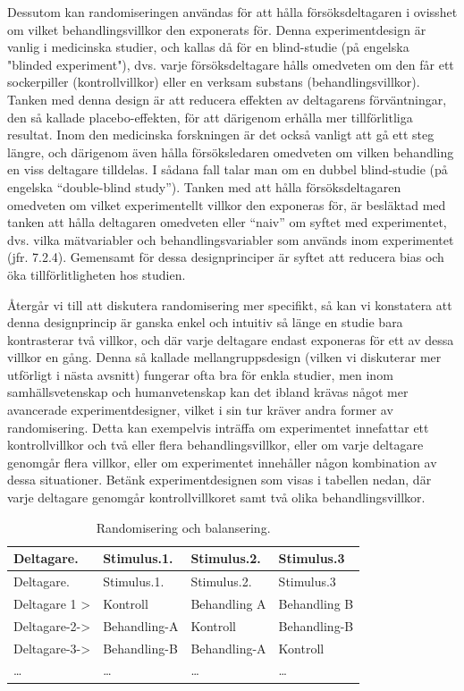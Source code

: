 \documentclass[
]{book}
\begin{document}
Dessutom kan randomiseringen användas för att hålla försöksdeltagaren i ovisshet om vilket behandlingsvillkor den exponerats för. Denna experimentdesign är vanlig i medicinska studier, och kallas då för en blind-studie (på engelska "blinded experiment"), dvs. varje försöksdeltagare hålls omedveten om den får ett sockerpiller (kontrollvillkor) eller en verksam substans (behandlingsvillkor). Tanken med denna design är att reducera effekten av deltagarens förväntningar, den så kallade placebo-effekten, för att därigenom erhålla mer tillförlitliga resultat. Inom den medicinska forskningen är det också vanligt att gå ett steg längre, och därigenom även hålla försöksledaren omedveten om vilken behandling en viss deltagare tilldelas. I sådana fall talar man om en dubbel blind-studie (på engelska ``double-blind study''). Tanken med att hålla försöksdeltagaren omedveten om vilket experimentellt villkor den exponeras för, är besläktad med tanken att hålla deltagaren omedveten eller ``naiv'' om syftet med experimentet, dvs. vilka mätvariabler och behandlingsvariabler som används inom experimentet (jfr. 7.2.4). Gemensamt för dessa designprinciper är syftet att reducera bias och öka tillförlitligheten hos studien.

Återgår vi till att diskutera randomisering mer specifikt, så kan vi konstatera att denna designprincip är ganska enkel och intuitiv så länge en studie bara kontrasterar två villkor, och där varje deltagare endast exponeras för ett av dessa villkor en gång. Denna så kallade mellangruppsdesign (vilken vi diskuterar mer utförligt i nästa avsnitt) fungerar ofta bra för enkla studier, men inom samhällsvetenskap och humanvetenskap kan det ibland krävas något mer avancerade experimentdesigner, vilket i sin tur kräver andra former av randomisering. Detta kan exempelvis inträffa om experimentet innefattar ett kontrollvillkor och två eller flera behandlingsvillkor, eller om varje deltagare genomgår flera villkor, eller om experimentet innehåller någon kombination av dessa situationer. Betänk experimentdesignen som visas i tabellen nedan, där varje deltagare genomgår kontrollvillkoret samt två olika behandlingsvillkor.

\begin{longtable}[]{@{}llll@{}}
\caption{\label{tab:tab-02-07-5-2-01}Randomisering och balansering.}\tabularnewline
\toprule
Deltagare. & Stimulus.1. & Stimulus.2. & Stimulus.3\tabularnewline
\midrule
\endfirsthead
\toprule
Deltagare. & Stimulus.1. & Stimulus.2. & Stimulus.3\tabularnewline
\midrule
\endhead
Deltagare 1 \textgreater{} & Kontroll & Behandling A & Behandling B\tabularnewline
Deltagare-2-\textgreater{} & Behandling-A & Kontroll & Behandling-B\tabularnewline
Deltagare-3-\textgreater{} & Behandling-B & Behandling-A & Kontroll\tabularnewline
\ldots{} & \ldots{} & \ldots{} & \ldots{}\tabularnewline
\bottomrule
\end{longtable}
\end{document}
